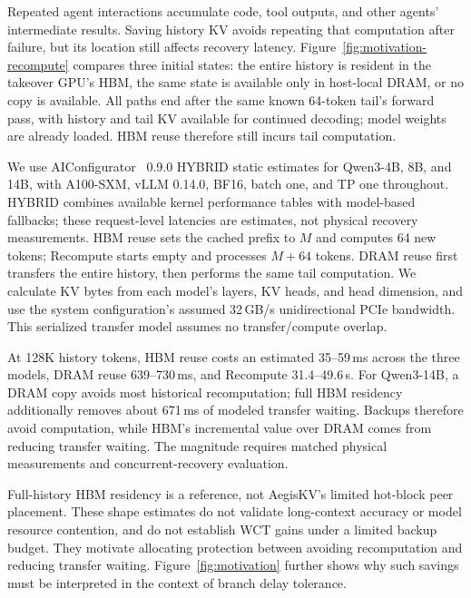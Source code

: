 

Repeated agent interactions accumulate code, tool outputs, and other
agents' intermediate results. Saving history KV avoids repeating that
computation after failure, but its location still affects recovery
latency. Figure~\ref{fig:motivation-recompute} compares three initial
states: the entire history is resident in the takeover GPU's HBM, the
same state is available only in host-local DRAM, or no copy is available.
All paths end after the same known 64-token tail's forward pass, with
history and tail KV available for continued decoding; model weights are
already loaded. HBM reuse therefore still incurs tail computation.

We use AIConfigurator~\cite{nvidia2026aiconfigurator} 0.9.0 HYBRID static
estimates for Qwen3-4B, 8B, and 14B, with A100-SXM, vLLM 0.14.0, BF16,
batch one, and TP one throughout. HYBRID combines available kernel
performance tables with model-based fallbacks; these request-level
latencies are estimates, not physical recovery measurements. HBM reuse
sets the cached prefix to $M$ and computes 64 new tokens; Recompute
starts empty and processes $M+64$ tokens. DRAM reuse first transfers the
entire history, then performs the same tail computation. We calculate
KV bytes from each model's layers, KV heads, and head dimension, and use
the system configuration's assumed 32\,GB/s unidirectional PCIe bandwidth.
This serialized transfer model assumes no transfer/compute overlap.

At 128K history tokens, HBM reuse costs an estimated 35--59\,ms across
the three models, DRAM reuse 639--730\,ms, and Recompute 31.4--49.6\,s.
For Qwen3-14B, a DRAM copy avoids most historical recomputation; full
HBM residency additionally removes about 671\,ms of modeled transfer
waiting. Backups therefore avoid computation, while HBM's incremental
value over DRAM comes from reducing transfer waiting. The magnitude
requires matched physical measurements and concurrent-recovery evaluation.

Full-history HBM residency is a reference, not AegisKV's limited hot-block
peer placement. These shape estimates do not validate long-context
accuracy or model resource contention, and do not establish WCT gains
under a limited backup budget. They motivate allocating protection
between avoiding recomputation and reducing transfer waiting.
Figure~\ref{fig:motivation} further shows why such savings must be
interpreted in the context of branch delay tolerance.

